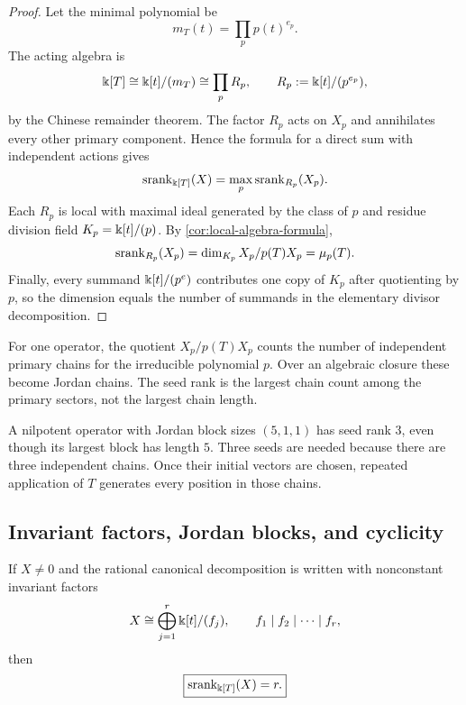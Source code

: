 \begin{proof}
Let the minimal polynomial be
\[
m_T(t)=\prod_{p}p(t)^{e_p}.
\]
The acting algebra is
\[
\Bbbk[T]\cong\Bbbk[t]/(m_T)
\cong\prod_pR_p,
\qquad
R_p:=\Bbbk[t]/(p^{e_p}),
\]
by the Chinese remainder theorem.  The factor $R_p$ acts on $X_p$ and annihilates every other primary component.  Hence the formula for a direct sum with independent actions gives
\[
\operatorname{srank}_{\Bbbk[T]}(X)=\max_p\operatorname{srank}_{R_p}(X_p).
\]
Each $R_p$ is local with maximal ideal generated by the class of $p$ and residue division field $K_p=\Bbbk[t]/(p)$.  By \cref{cor:local-algebra-formula},
\[
\operatorname{srank}_{R_p}(X_p)
=
\dim_{K_p}X_p/p(T)X_p
=
\mu_p(T).
\]
Finally, every summand $\Bbbk[t]/(p^e)$ contributes one copy of $K_p$ after quotienting by $p$, so the dimension equals the number of summands in the elementary divisor decomposition.
\end{proof}

\begin{interpretation}
For one operator, the quotient \(X_p/p(T)X_p\) counts the number of independent primary chains for the irreducible polynomial \(p\).  Over an algebraic closure these become Jordan chains.  The seed rank is the largest chain count among the primary sectors, not the largest chain length.
\end{interpretation}

\begin{microexample}[title={Block count versus block size}]
A nilpotent operator with Jordan block sizes \((5,1,1)\) has seed rank \(3\), even though its largest block has length \(5\).  Three seeds are needed because there are three independent chains.  Once their initial vectors are chosen, repeated application of \(T\) generates every position in those chains.
\end{microexample}


\subsection{Invariant factors, Jordan blocks, and cyclicity}
\begin{corollary}
\label{cor:invariant-factor-count}
If $X\neq0$ and the rational canonical decomposition is written with nonconstant invariant factors
\[
X\cong\bigoplus_{j=1}^{r}\Bbbk[t]/(f_j),
\qquad
f_1\mid f_2\mid\cdots\mid f_r,
\]
then
\[
\boxed{\operatorname{srank}_{\Bbbk[T]}(X)=r.}
\]
\end{corollary}

